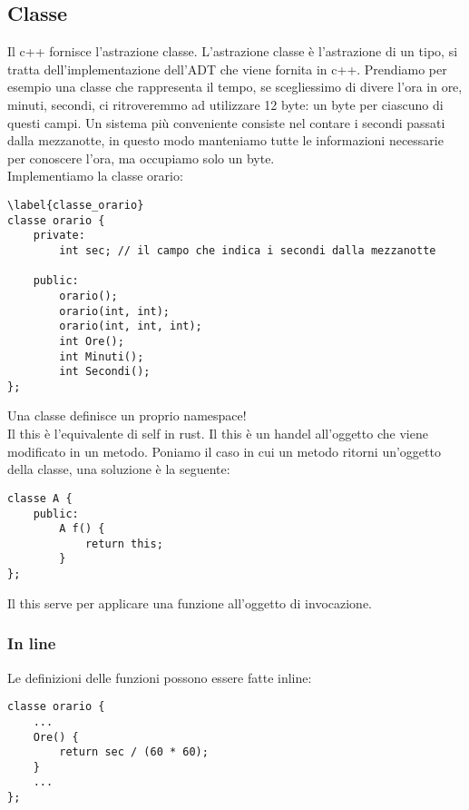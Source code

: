 \documentclass{article}
\begin{document}

\subsection{Classe}
Il c++ fornisce l'astrazione classe. L'astrazione classe è l'astrazione di un
tipo, si tratta dell'implementazione dell'ADT che viene fornita in c++.
Prendiamo per esempio una classe che rappresenta il tempo, se scegliessimo di
divere l'ora in ore, minuti, secondi, ci ritroveremmo ad utilizzare 12 byte: un
byte per ciascuno di questi campi. Un sistema più conveniente consiste nel
contare i secondi passati dalla mezzanotte, in questo modo manteniamo tutte le
informazioni necessarie per conoscere l'ora, ma occupiamo solo un byte.\\
Implementiamo la classe orario:

\begin{lstlisting}
\label{classe_orario}
classe orario {
    private:
        int sec; // il campo che indica i secondi dalla mezzanotte

    public:
        orario();
        orario(int, int);
        orario(int, int, int);
        int Ore();
        int Minuti();
        int Secondi();
};
\end{lstlisting}
Una classe definisce un proprio namespace!\\
Il this è l'equivalente di self in rust. Il this è un handel all'oggetto che
viene modificato in un metodo. Poniamo il caso in cui un metodo ritorni
un'oggetto della classe, una soluzione è la seguente:
\begin{lstlisting}
classe A {
    public:
        A f() {
            return this;
        }
};
\end{lstlisting}
Il this serve per applicare una funzione all'oggetto di invocazione.

\subsubsection{In line}
Le definizioni delle funzioni possono essere fatte inline:
\begin{lstlisting}
classe orario {
    ...
    Ore() {
        return sec / (60 * 60);
    }
    ...
};
\end{lstlisting}
\end{document}
